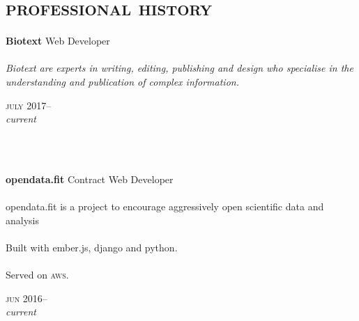 
\vspace{-0.6cm}
\section*{\textsc{professional history}}
\vspace{-0.2cm}

\begin{minipage}[t]{0.70\textwidth}
\textbf{Biotext}\phantom{..} Web Developer\\
\\
\textit{
Biotext are experts in writing, editing, publishing and design who specialise
in the understanding and publication of complex information.}
{\small
\textit{}
\par}
\end{minipage}
\begin{minipage}[t]{0.30\textwidth}
{
\hfill \textsc{july} 2017--\\ 
\hspace*{0pt} \hfill \textit{current}
\par
}
\end{minipage}
\\
\\

\begin{minipage}[t]{0.70\textwidth}
\textbf{opendata.fit}\phantom{..} Contract Web Developer\\
\\
opendata.fit is a project to encourage aggressively open scientific data and 
analysis 
\\
\\
Built with ember.js, django and python. \\
\\
Served on \textsc{aws}.
{\small
\textit{}
\par}
\end{minipage}
\begin{minipage}[t]{0.30\textwidth}
{
\hfill \textsc{jun} 2016--\\ 
\hspace*{0pt} \hfill \textit{current}
\par
}
\end{minipage}
\\
\\

